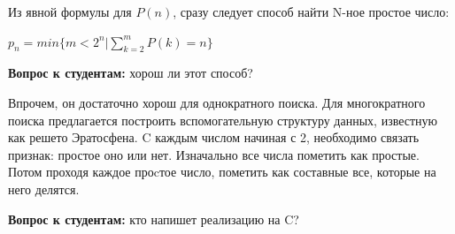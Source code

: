 \documentclass[a4paper,12pt,oneside]{article}
\newif\ifanswers
\begin{document}
\ifanswers
Возможный ответ:

\begin{lstlisting}
int
is_prime(unsigned long long nxt)
{
  unsigned r, f;

  if (nxt == 1) return 0;
  if (nxt < 4) return 1;
  if ((nxt % 2) == 0) return 0;
  if (nxt < 9) return 1;
  if ((nxt % 3) == 0) return 0;
  
  r = (unsigned) sqrt ((double)nxt);
  f = 5;

  while (f <= r)
    {
      if ((nxt % f) == 0) return 0;
      if ((nxt % (f + 2)) == 0) return 0;
      f += 6;
    }

  return 1;
}
\end{lstlisting}
\fi

Из явной формулы для $P(n)$, сразу следует способ найти N-ное простое число:

$p_n=min\{m<2^n|\sum\limits_{k=2}^{m}P(k)=n\}$

\textbf{Вопрос к студентам:} хорош ли этот способ?

\ifanswers
Правильный ответ: не очень. Он предполагает чуть менее чем квадратичную сложность проверки, завернутую в линейный перебор. Это очень долго даже для 10000-го простого числа.
\fi

Впрочем, он достаточно хорош для однократного поиска. Для многократного поиска предлагается построить вспомогательную структуру данных, известную как решето Эратосфена. C каждым числом начиная с 2, необходимо связать признак: простое оно или нет. Изначально все числа пометить как простые. Потом проходя каждое проcтое число, пометить как составные все, которые на него делятся.

\textbf{Вопрос к студентам:} кто напишет реализацию на C?

\ifanswers
Возможный ответ:

\begin{lstlisting}
int *
init_sieve (int nofprimes)
{
  int i, j;
  int *retval;

  retval = calloc (nofprimes, sizeof (int));

  for (i = 2; i * i < nofprimes; ++i)
    if (retval[i] == 0)
      for (j = i * i; j < nofprimes; j += i)
        retval[j] = 1;

  return retval;
}
\end{lstlisting}

Хорош ли этот ответ? В общем да, но следует обратить внимание, что он тратит примерно в 32 раза больше памяти, чем реально нужно для хранения однобитовых признаков.
\fi
\end{document}
